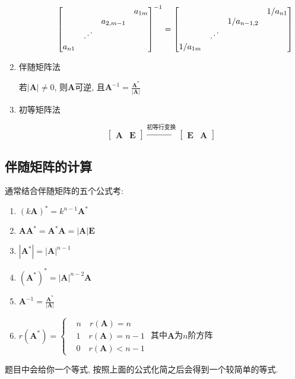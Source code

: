 \begin{enumerate}
\begin{enumerate}
\begin{enumerate}
\begin{equation*}
\begin{bmatrix}
& & & a_{1m} \\
& & a_{2,m-1} & \\
& \reflectbox{$\ddots$} & & \\
a_{n1} & & &
\end{bmatrix}^{-1}=
\begin{bmatrix}
& & & 1/a_{n1} \\
& & 1/a_{n-1,2} & \\
& \reflectbox{$\ddots$} & & \\
1/a_{1m}& & &
\end{bmatrix}
\end{equation*}
\end{enumerate}
\end{enumerate}
\item 伴随矩阵法 \par 
若$ |\bm{A}|\neq 0 $, 则$ \bm{A} $可逆, 且$ \bm{A}^{-1}=\frac{\bm{A}^{*}}{|\bm{A}|} $
\item 初等矩阵法 \par 
\begin{equation*}
\begin{bmatrix}
\bm{A} & \bm{E}
\end{bmatrix}\xrightarrow{\text{初等行变换}}
\begin{bmatrix}
\bm{E} & \bm{A}
\end{bmatrix}
\end{equation*}
\end{enumerate}
\subsection{伴随矩阵的计算}
通常结合伴随矩阵的五个公式考:
\begin{enumerate}
\item $ (k \bm{A})^{*}=k^{n-1}\bm{A}^{*} $
\item $ \bm{A}\bm{A}^{*}=\bm{A}^{*}\bm{A}=|\bm{A}|\bm{E} $
\item $ |\bm{A}^{*}|=|\bm{A}|^{n-1} $
\item $ (\bm{A}^{*})^{*}=|\bm{A}|^{n-2}\bm{A} $
\item $ \bm{A}^{-1}=\frac{\bm{A}^{*}}{|\bm{A}|} $
\item $ r(\bm{A}^{*})=\left\{
\begin{aligned}
& n\quad r(\bm{A})=n \\
& 1\quad r(\bm{A})=n-1 \\
& 0\quad r(\bm{A})<n-1
\end{aligned}\right.$ 其中$ \bm{A} $为$ n $阶方阵
\end{enumerate}\par
题目中会给你一个等式, 按照上面的公式化简之后会得到一个较简单的等式.
